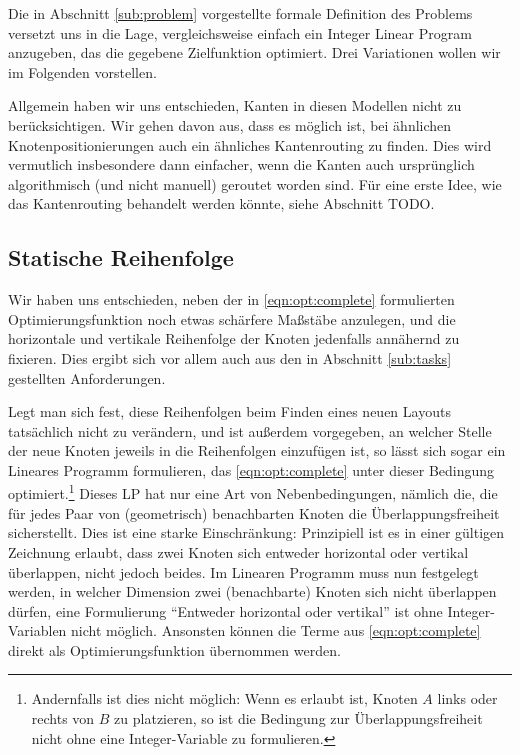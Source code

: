 Die in Abschnitt \ref{sub:problem} vorgestellte formale Definition des Problems versetzt uns in die Lage, vergleichsweise einfach ein Integer Linear Program anzugeben, das die gegebene Zielfunktion optimiert. Drei Variationen wollen wir im Folgenden vorstellen.

Allgemein haben wir uns entschieden, Kanten in diesen Modellen nicht zu berücksichtigen. Wir gehen davon aus, dass es möglich ist, bei ähnlichen Knotenpositionierungen auch ein ähnliches Kantenrouting zu finden. Dies wird vermutlich insbesondere dann einfacher, wenn die Kanten auch ursprünglich algorithmisch (und nicht manuell) geroutet worden sind. Für eine erste Idee, wie das Kantenrouting behandelt werden könnte, siehe Abschnitt TODO.

\subsection{Statische Reihenfolge}

Wir haben uns entschieden, neben der in \ref{eqn:opt:complete} formulierten Optimierungsfunktion noch etwas schärfere Maßstäbe anzulegen, und die horizontale und vertikale Reihenfolge der Knoten jedenfalls annähernd zu fixieren. Dies ergibt sich vor allem auch aus den in Abschnitt \ref{sub:tasks} gestellten Anforderungen.

Legt man sich fest, diese Reihenfolgen beim Finden eines neuen Layouts tatsächlich nicht zu verändern, und ist außerdem vorgegeben, an welcher Stelle der neue Knoten jeweils in die Reihenfolgen einzufügen ist, so lässt sich sogar ein Lineares Programm formulieren, das \ref{eqn:opt:complete} unter dieser Bedingung optimiert.\footnote{Andernfalls ist dies nicht möglich: Wenn es erlaubt ist, Knoten $A$ links oder rechts von $B$ zu platzieren, so ist die Bedingung zur Überlappungsfreiheit nicht ohne eine Integer-Variable zu formulieren.} Dieses LP hat nur eine Art von Nebenbedingungen, nämlich die, die für jedes Paar von (geometrisch) benachbarten Knoten die Überlappungsfreiheit sicherstellt. Dies ist eine starke Einschränkung: Prinzipiell ist es in einer gültigen Zeichnung erlaubt, dass zwei Knoten sich entweder horizontal oder vertikal überlappen, nicht jedoch beides. Im Linearen Programm muss nun festgelegt werden, in welcher Dimension zwei (benachbarte) Knoten sich nicht überlappen dürfen, eine Formulierung "`Entweder horizontal oder vertikal"' ist ohne Integer-Variablen nicht möglich. Ansonsten können die Terme aus \ref{eqn:opt:complete} direkt als Optimierungsfunktion übernommen werden.

